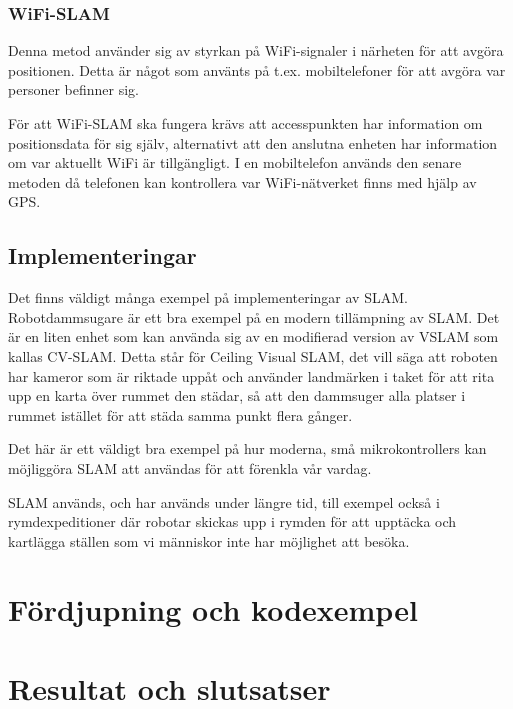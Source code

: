 \documentclass[a4paper,12pt,fleqn]{article}
\begin{document}
\subsubsection{WiFi-SLAM}
Denna metod använder sig av styrkan på WiFi-signaler i närheten för att avgöra positionen. Detta är något som använts på t.ex. mobiltelefoner för att avgöra var personer befinner sig. 

För att WiFi-SLAM ska fungera krävs att accesspunkten har information om positionsdata för sig själv, alternativt att den anslutna enheten har information om var aktuellt WiFi är tillgängligt. I en mobiltelefon används den senare metoden då telefonen kan kontrollera var WiFi-nätverket finns med hjälp av GPS. 

\subsection{Implementeringar}

Det finns väldigt många exempel på implementeringar av SLAM. Robotdammsugare är ett bra exempel på en modern tillämpning av SLAM. Det är en liten enhet som kan använda sig av en modifierad version av VSLAM som kallas CV-SLAM. Detta står för Ceiling Visual SLAM, det vill säga att roboten har kameror som är riktade uppåt och använder landmärken i taket för att rita upp en karta över rummet den städar, så att den dammsuger alla platser i rummet istället för att städa samma punkt flera gånger. 

Det här är ett väldigt bra exempel på hur moderna, små mikrokontrollers kan möjliggöra SLAM att användas för att förenkla vår vardag.  

SLAM används, och har används under längre tid, till exempel också i rymdexpeditioner där robotar skickas upp i rymden för att upptäcka och kartlägga ställen som vi människor inte har möjlighet att besöka. 

\newpage
\section{Fördjupning och kodexempel}


\section{Resultat och slutsatser}
\end{document}
